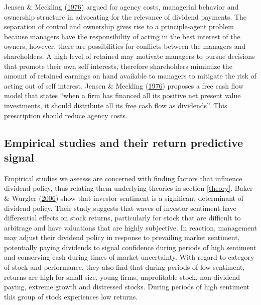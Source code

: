 \documentclass[11pt,preprint, authoryear]{elsarticle}
\numberwithin{equation}{section}
\numberwithin{figure}{section}
\numberwithin{table}{section}
\begin{document}
Jensen \& Meckling (\protect\hyperlink{ref-jensen1976theory}{1976})
argued for agency costs, managerial behavior and ownership structure in
advocating for the relevance of dividend payments. The separation of
control and ownership gives rise to a principle-agent problem because
managers have the responsibility of acting in the best interest of the
owners, however, there are possibilities for conflicts between the
managers and shareholders. A high level of retained may motivate
managers to pursue decisions that promote their own self interests,
therefore shareholders mimimize the amount of retained earnings on hand
available to managers to mitigate the risk of acting out of self
interest. Jensen \& Meckling
(\protect\hyperlink{ref-jensen1976theory}{1976}) proposes a free cash
flow model that states ``when a firm has financed all its positive net
present value investments, it should distribute all its free cash flow
as dividends''. This prescription should reduce agency costs.

\hypertarget{empirical-studies-and-their-return-predictive-signal}{%
\subsection{Empirical studies and their return predictive
signal}\label{empirical-studies-and-their-return-predictive-signal}}

Empirical studies we aseesss are concerned with finding factors that
influence dividend policy, thus relating them underlying theories in
section \ref{theory}. Baker \& Wurgler
(\protect\hyperlink{ref-baker2006investor}{2006}) show that investor
sentiment is a significant determinant of dividend policy. Their study
suggests that waves of investor sentiment have differential effects on
stock returns, particularly for stock that are difficult to arbitrage
and have valuations that are highly subjective. In reaction, management
may adjust their dividend policy in response to prevailing market
sentiment, potentially paying dividends to signal confidence during
periods of high sentiment and conserving cash during times of market
uncertainty. With regard to category of stock and performance, they also
find that during periods of low sentiment, returns are high for small
size, young firms, unprofitable stock, non dividend paying, extreme
growth and distressed stocks. During periods of high sentiment this
group of stock experiences low returns.
\end{document}
